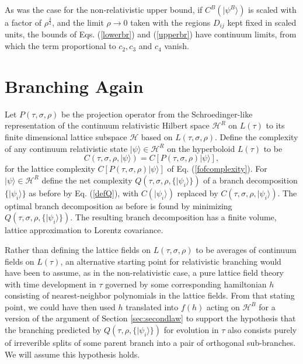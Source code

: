 \documentclass[12pt,amsmath,amssymb,onecolumn]{revtex4-2}
\begin{document}
As was the case for the
non-relativistic upper bound, if $C^B( |\psi^B \rangle )$ is scaled with a factor of $\rho^\frac{3}{2}$,
and the limit $\rho \rightarrow 0$ taken with
the regions $D_{ij}$ kept fixed in scaled units, the bounds of Eqs. (\ref{lowerbr}) and
(\ref{upperbr}) have continuum limits, from which the term proportional to $c_2, c_3$ and $c_4$
vanish.





\section{\label{subsec:relativisticbranching} Branching Again}

Let $P( \tau, \sigma, \rho)$ be the projection operator from the
Schroedinger-like representation of the
continuum relativistic Hilbert space $\mathcal{H}^R$
on $L( \tau)$ to its finite
dimensional lattice
subspace $\mathcal{H}$ based on $L(\tau, \sigma, \rho)$.
Define the complexity of any continuum relativistic state $|\psi \rangle  \in \mathcal{H}^R$
on the hyperboloid $L( \tau)$ to be
\begin{equation}
  \label{contcomplex}
  C( \tau, \sigma, \rho, |\psi \rangle ) = C[ P( \tau, \sigma, \rho) |\psi \rangle ],
\end{equation}
for the lattice complexity  $C[ P( \tau, \sigma, \rho) |\psi \rangle ]$
of Eq. (\ref{fofcomplexity}).
For $|\psi \rangle  \in \mathcal{H}^R$ 
define the net complexity $Q( \tau, \sigma, \rho, \{|\psi_i \rangle \})$ of 
a branch decomposition $\{|\psi_i \rangle \}$ 
as before by Eq. (\ref{defQ}), with $C( |\psi_i \rangle )$
replaced by $C( \tau, \sigma, \rho, |\psi_i \rangle )$.
The optimal branch decomposition as before is found by
minimizing $Q(\tau, \sigma, \rho, \{|\psi_i \rangle \})$.
The resulting branch decomposition has a finite volume, lattice
approximation to Lorentz covariance.

Rather than defining the lattice fields on $L( \tau, \sigma, \rho)$
to be averages of continuum fields on $L( \tau)$, an
alternative starting point for relativistic
branching would have been to
assume, as in the non-relativistic case, a pure
lattice field theory with time
development in $\tau$ governed by some corresponding
hamiltonian $h$ consisting of nearest-neighbor
polynomials in the lattice fields.
From that stating point, we could have then
used $h$ translated into $f(h)$ acting on $\mathcal{H}^B$
for a version of the argument of
Section \ref{sec:secondlaw} to support the
hypothesis that the branching predicted by
$Q(\tau, \rho, \{|\psi_i \rangle \})$
for evolution in $\tau$ also consists
purely of irreverible splits of
some parent branch into a pair of
orthogonal sub-branches.
We will assume this hypothesis
holds.
\end{document}

